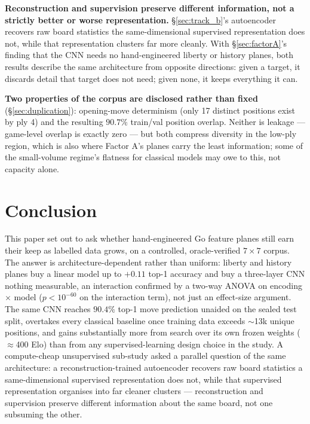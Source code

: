 \documentclass[conference,a4paper]{IEEEtran}
\begin{document}
\textbf{Reconstruction and supervision preserve different information, not a
strictly better or worse representation.} \S\ref{sec:track_b}'s autoencoder
recovers raw board statistics the same-dimensional supervised representation
does not, while that representation clusters far more cleanly. With
\S\ref{sec:factorA}'s finding that the CNN needs no hand-engineered liberty
or history planes, both results describe the same architecture from opposite
directions: given a target, it discards detail that target does not need;
given none, it keeps everything it can.

\textbf{Two properties of the corpus are disclosed rather than fixed}
(\S\ref{sec:duplication}): opening-move determinism (only 17 distinct
positions exist by ply 4) and the resulting $90.7\%$ train/val position
overlap. Neither is leakage --- game-level overlap is exactly zero --- but
both compress diversity in the low-ply region, which is also where Factor
A's planes carry the least information; some of the small-volume regime's
flatness for classical models may owe to this, not capacity alone.

\section{Conclusion}
\label{sec:conclusion}
This paper set out to ask whether hand-engineered Go feature planes still earn
their keep as labelled data grows, on a controlled, oracle-verified
$7\times7$ corpus. The answer is architecture-dependent rather than uniform:
liberty and history planes buy a linear model up to $+0.11$ top-1 accuracy
and buy a three-layer CNN nothing measurable, an interaction confirmed by a
two-way ANOVA on encoding $\times$ model ($p<10^{-60}$ on the interaction
term), not just an effect-size argument. The same CNN reaches $90.4\%$ top-1
move prediction unaided on the sealed test split, overtakes every classical
baseline once training data exceeds $\sim$13k unique positions, and gains
substantially more from
search over its own frozen weights ($\approx$400 Elo) than from any
supervised-learning design choice in the study. A compute-cheap unsupervised
sub-study asked a parallel question of the same architecture: a
reconstruction-trained autoencoder recovers raw board statistics a
same-dimensional supervised representation does not, while that supervised
representation organises into far cleaner clusters --- reconstruction and
supervision preserve different information about the same board, not one
subsuming the other.
\end{document}
